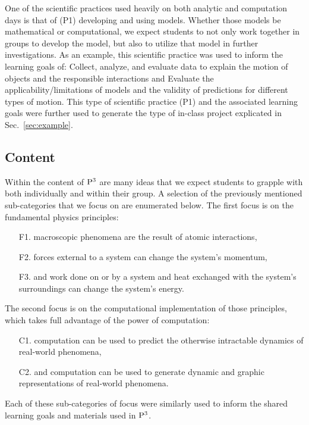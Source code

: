 \documentclass{msuphddissertation}
\begin{document}
\begin{doublespace}
One of the scientific practices used heavily on both analytic and computation days is that of (P1) developing and using models.  Whether those models be mathematical or computational, we expect students to not only work together in groups to develop the model, but also to utilize that model in further investigations.  As an example, this scientific practice was used to inform the learning goals of:  {\quote Collect, analyze, and evaluate data to explain the motion of objects and the responsible interactions\endquote} \noindent and {\quote Evaluate the applicability/limitations of models and the validity of predictions for different types of motion.
\endquote}  \noindent This type of scientific practice (P1) and the associated learning goals were further used to generate the type of in-class project explicated in Sec.~\ref{sec:example}.

\subsection{Content}

Within the content of ${\rm P}^{3}$ are many ideas that we expect students to grapple with both individually and within their group.  A selection of the previously mentioned sub-categories that we focus on are enumerated below.  The first focus is on the fundamental physics principles: \begin{enumerate}
\item[F1.] macroscopic phenomena are the result of atomic interactions,
\item[F2.] forces external to a system can change the system's momentum,
\item[F3.] and work done on or by a system and heat exchanged with the system's surroundings can change the system's energy.
\end{enumerate} The second focus is on the computational implementation of those principles, which takes full advantage of the power of computation: \begin{enumerate}
\item[C1.] computation can be used to predict the otherwise intractable dynamics of real-world phenomena,
\item[C2.] and computation can be used to generate dynamic and graphic representations of real-world phenomena.
\end{enumerate}  Each of these sub-categories of focus were similarly used to inform the shared learning goals and materials used in ${\rm P}^{3}$.


\end{doublespace}
\end{document}
